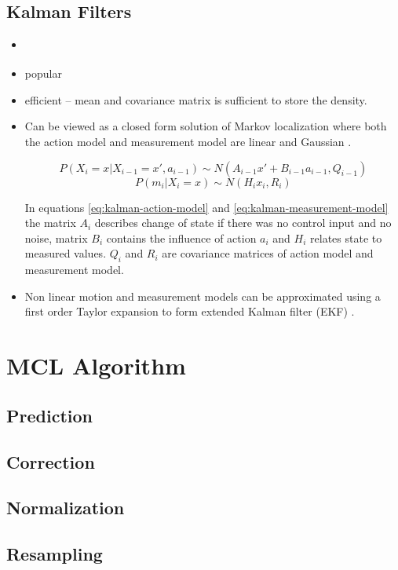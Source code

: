 

\subsection{Kalman Filters}
\label{sec:kalman}

\begin{itemize}
\item \cite{kalman60,welch95}
\item popular
\item efficient -- mean and covariance matrix is sufficient to store the density.
\item Can be viewed as a closed form solution of Markov localization where both the
	action model and measurement model are linear and Gaussian \cite{diard}.

	\begin{equation}
	\label{eq:kalman-action-model}
	P(X_i = x | X_{i-1} = x', a_{i - 1}) \sim N(A_{i - 1}x' + B_{i - 1}a_{i - 1}, Q_{i - 1})
	\end{equation}
	\begin{equation}
	\label{eq:kalman-measurement-model}
	P(m_{i} | X_i = x) \sim N(H_{i}x_{i}, R_i)
	\end{equation}
	
	In equations \eqref{eq:kalman-action-model} and \eqref{eq:kalman-measurement-model}
	the matrix \(A_i\) describes change of state if there was no control input and no noise,
	matrix \(B_i\) contains the influence of action \(a_i\) and \(H_i\) relates state to measured
	values.
	\(Q_i\) and \(R_i\) are covariance matrices of action model and measurement model.

\item Non linear motion and measurement models can be approximated 
	using a first order Taylor expansion to form extended Kalman
	filter (EKF) \cite{welch95}.
\end{itemize}

\section{MCL Algorithm}
\label{sec:mcl-algorithm}

\cite{dellaert99}

\subsection{Prediction}
\subsection{Correction}
\subsection{Normalization}
\subsection{Resampling}
